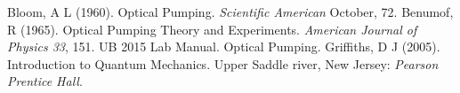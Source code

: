 \documentclass[twocolumn]{article}
\begin{document}
\begin{thebibliography}{9}
Bloom, A L (1960). Optical Pumping. \emph{Scientific American} October, 72.
Benumof, R (1965). Optical Pumping Theory and Experiments. \emph{American 
Journal of Physics 33}, 151.
UB 2015 Lab Manual. Optical Pumping.
Griffiths, D J (2005). Introduction to Quantum Mechanics. Upper Saddle river, 
New Jersey: \emph{Pearson Prentice Hall}.

\end{thebibliography}
\end{document}
